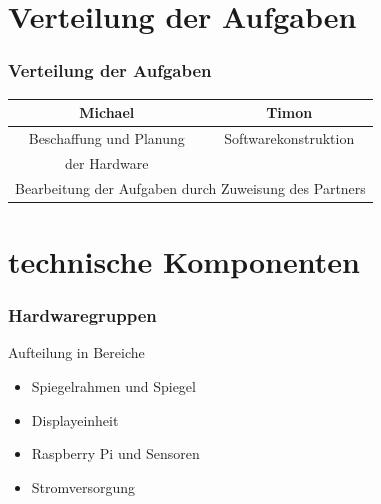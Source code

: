\documentclass[11pt]{beamer}
\begin{document}
	\section{Verteilung der Aufgaben}
	\begin{frame}
		\frametitle{Verteilung der Aufgaben}
		\begin{tabular}{|c|c|}
			\hline
			Michael & Timon\\
			\hline\hline
			Beschaffung und Planung & Softwarekonstruktion\\
			der Hardware & \\
			\hline\hline
			\multicolumn{2}{|c|}{Bearbeitung der Aufgaben durch Zuweisung des Partners}\\
			\hline
		\end{tabular}
	\end{frame}

	\section{technische Komponenten}
	\begin{frame}
		\frametitle{Hardwaregruppen}
		\begin{center}
			\Large{Aufteilung in Bereiche}
		\end{center}
		\begin{itemize}
		\item Spiegelrahmen und Spiegel
		\item Displayeinheit
		\item Raspberry Pi und Sensoren
		\item Stromversorgung
		\end{itemize}
	\end{frame}
	
\end{document}

